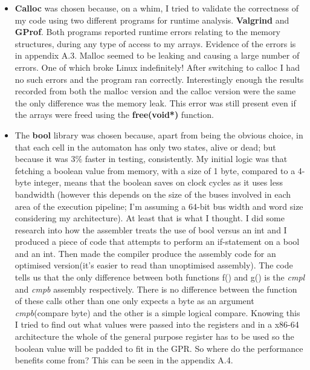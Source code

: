 \documentclass[11pt]{article} %
\begin{document}
\begin{itemize}
\item {\bf Calloc} was chosen because, on a whim, I tried to validate the correctness of my code using two different programs for runtime analysis. {\bf Valgrind} and {\bf GProf}. Both programs reported runtime errors relating to the memory structures, during any type of access to my arrays. Evidence of the errors is in appendix A.3. Malloc seemed to be leaking and causing a large number of errors. One of which broke Linux indefinitely! After switching to calloc I had no such errors and the program ran correctly. Interestingly enough the results recorded from both the malloc version and the calloc version were the same the only difference was the memory leak. This error was still present even if the arrays were freed using the {\bf free(void*)} function.
\item The {\bf bool} library was chosen because, apart from being the obvious choice, in that each cell in the automaton has only two states, alive or dead; but because it was 3\% faster in testing, consistently. My initial logic was that fetching a boolean value from memory, with a size of 1 byte, compared to a 4-byte integer, means that the boolean saves on clock cycles as it uses less bandwidth (however this depends on the size of the buses involved in each area of the execution pipeline; I'm assuming a 64-bit bus width and word size considering my architecture). At least that is what I thought. I did some research into how the assembler treats the use of bool versus an int and I produced a piece of code that attempts to perform an if-statement on a bool and an int. Then made the compiler produce the assembly code for an optimised version(it's easier to read than unoptimised assembly). The code tells us that the only difference between both functions f() and g() is the {\it cmpl} and {\it cmpb} assembly respectively. There is no difference between the function of these calls other than one only expects a byte as an argument {\it cmpb}(compare byte) and the other is a simple logical compare. Knowing this I tried to find out what values were passed into the registers and in a x86-64 architecture the whole of the general purpose register has to be used so the boolean value will be padded to fit in the GPR. So where do the performance benefits come from? This can be seen in the appendix A.4.
\end{itemize}
\end{document}
